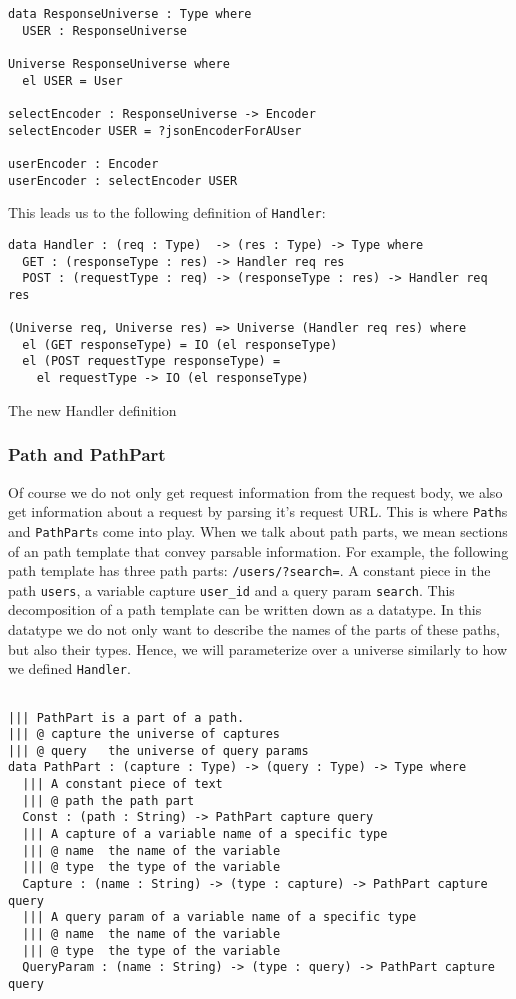 \documentclass[12pt,a4paper]{article}
\begin{document}
\begin{verbatim}
data ResponseUniverse : Type where
  USER : ResponseUniverse

Universe ResponseUniverse where
  el USER = User

selectEncoder : ResponseUniverse -> Encoder
selectEncoder USER = ?jsonEncoderForAUser

userEncoder : Encoder
userEncoder : selectEncoder USER
\end{verbatim}

This leads us to the following definition of \texttt{Handler}:

\begin{listing}
  \begin{verbatim}
data Handler : (req : Type)  -> (res : Type) -> Type where
  GET : (responseType : res) -> Handler req res
  POST : (requestType : req) -> (responseType : res) -> Handler req res

(Universe req, Universe res) => Universe (Handler req res) where
  el (GET responseType) = IO (el responseType)
  el (POST requestType responseType) =
    el requestType -> IO (el responseType)
  \end{verbatim}
  \caption{The new Handler definition}
\end{listing}

\subsubsection{Path and PathPart}
Of course we do not only get request information from the request body,
we also get information about a request by parsing it's request URL. This
is where \texttt{Path}s and \texttt{PathPart}s come into play. 
When we talk about path parts, we mean sections of an path template that convey parsable information.
For example, the following path template has three path parts: \texttt{/users/?search=}. A constant piece
in the path \texttt{users}, a variable capture \texttt{user\_id} and a query param \texttt{search}. This
decomposition of a path template can be written down as a datatype. In this datatype we do not only
want to describe the names of the parts of these paths, but also their types. Hence, we will parameterize
over a universe similarly to how we defined \texttt{Handler}.
\begin{verbatim}

||| PathPart is a part of a path.
||| @ capture the universe of captures
||| @ query   the universe of query params
data PathPart : (capture : Type) -> (query : Type) -> Type where
  ||| A constant piece of text
  ||| @ path the path part
  Const : (path : String) -> PathPart capture query
  ||| A capture of a variable name of a specific type
  ||| @ name  the name of the variable
  ||| @ type  the type of the variable
  Capture : (name : String) -> (type : capture) -> PathPart capture query
  ||| A query param of a variable name of a specific type
  ||| @ name  the name of the variable
  ||| @ type  the type of the variable
  QueryParam : (name : String) -> (type : query) -> PathPart capture query
\end{verbatim}
\end{document}
